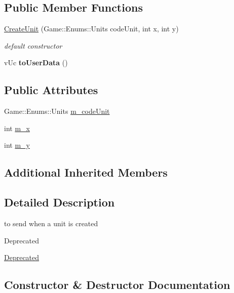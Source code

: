 \subsection*{Public Member Functions}
\begin{DoxyCompactItemize}
\item 
\hyperlink{class_network_1_1_messages_1_1_create_unit_a2b5513d4f33b71a33f614ce2743718de}{Create\+Unit} (Game\+::\+Enums\+::\+Units code\+Unit, int x, int y)
\begin{DoxyCompactList}\small\item\em default constructor \end{DoxyCompactList}\item 
\mbox{\label{class_network_1_1_messages_1_1_create_unit_a0636db2f1aeeb3cc905bf1f89e57011d}} 
v\+Uc {\bfseries to\+User\+Data} ()
\end{DoxyCompactItemize}
\subsection*{Public Attributes}
\begin{DoxyCompactItemize}
\item 
Game\+::\+Enums\+::\+Units \hyperlink{class_network_1_1_messages_1_1_create_unit_a779e91264a3e8b327e51c86707925d5f}{m\+\_\+code\+Unit}
\item 
int \hyperlink{class_network_1_1_messages_1_1_create_unit_a931c24a3ded3a5048b2f00b76b8df4ce}{m\+\_\+x}
\item 
int \hyperlink{class_network_1_1_messages_1_1_create_unit_ae41cd589bb16c09893cc6d990561adfc}{m\+\_\+y}
\end{DoxyCompactItemize}
\subsection*{Additional Inherited Members}


\subsection{Detailed Description}
to send when a unit is created 

\begin{DoxyRefDesc}{Deprecated}
\item[\hyperlink{deprecated__deprecated000001}{Deprecated}]\end{DoxyRefDesc}


\subsection{Constructor \& Destructor Documentation}
\mbox{\label{class_network_1_1_messages_1_1_create_unit_a2b5513d4f33b71a33f614ce2743718de}} 
